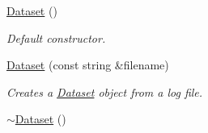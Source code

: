 \begin{DoxyCompactItemize}
\item 
\hypertarget{class_dataset_a2ef0a4a688a218d55ef061c6df659a4a}{\hyperlink{class_dataset_a2ef0a4a688a218d55ef061c6df659a4a}{\-Dataset} ()}\label{class_dataset_a2ef0a4a688a218d55ef061c6df659a4a}

\begin{DoxyCompactList}\small\item\em \-Default constructor. \end{DoxyCompactList}\item 
\hyperlink{class_dataset_a299c3198f6325d0c627aa029ed24e2e5}{\-Dataset} (const string \&filename)
\begin{DoxyCompactList}\small\item\em \-Creates a \hyperlink{class_dataset}{\-Dataset} object from a log file. \end{DoxyCompactList}\item 
\hypertarget{class_dataset_a7f38b79ccbf9ada90d68d3a50250b193}{\hyperlink{class_dataset_a7f38b79ccbf9ada90d68d3a50250b193}{$\sim$\-Dataset} ()}\label{class_dataset_a7f38b79ccbf9ada90d68d3a50250b193}


\end{DoxyCompactItemize}

